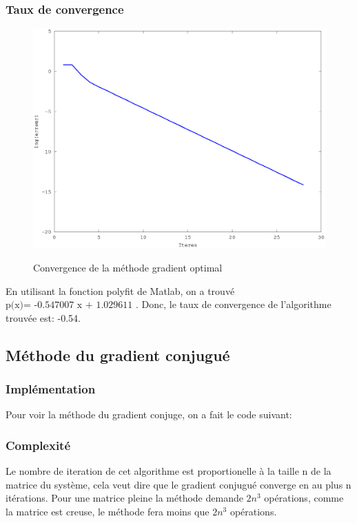 \documentclass[a4paper,11pt]{article}
\begin{document}
\subsubsection{Taux de convergence}
\begin{figure}[h!]
  \begin{centering}
    \includegraphics[scale=0.5]{../grad_optimal}
    \label{rspro2}
    \par\end{centering}
  \caption{Convergence de la méthode gradient optimal}
  \label{fig:jacobi-conv}
\end{figure}

En utilisant la fonction polyfit de Matlab, on a trouvé $\text{p(x)= -0.547007 x
  + 1.029611 }$. Donc, le taux de convergence de
l’algorithme trouvée est: -0.54.

\subsection{Méthode du gradient conjugué}
\subsubsection{Implémentation}

Pour voir la méthode du gradient conjuge, on a fait le code suivant:
 
\begin{multicols}{2}
  
\end{multicols}

\subsubsection{Complexité}
Le nombre de iteration de cet algorithme est proportionelle à la taille n de la matrice du système, cela veut dire que le gradient conjugué converge en au plus n itérations.
Pour une matrice  pleine la méthode demande $2n^3$  opérations, comme la matrice
est creuse, le méthode fera moins que $2n^3$  opérations.
\end{document}
